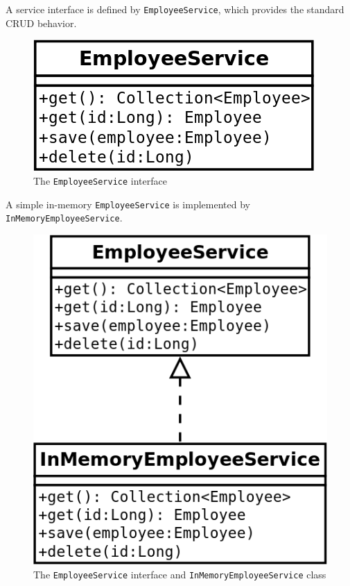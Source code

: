 \documentclass{article}
\begin{document}


A service interface is defined by \texttt{EmployeeService}, which provides the standard CRUD behavior.

\vspace{10pt}
\begin{figure}[H]
\begin{center}
\includegraphics[scale=0.5]{images/core/class-EmployeeService.png}
\end{center}
\caption{The \texttt{EmployeeService} interface}
\label{fig:core/EmployeeService}
\end{figure}



A simple in-memory \texttt{EmployeeService} is implemented by \texttt{InMemoryEmployeeService}.

\vspace{10pt}
\begin{figure}[H]
\begin{center}
\includegraphics[scale=0.5]{images/core/class-EmployeeService-InMemoryEmployeeService.png}
\end{center}
\caption{The \texttt{EmployeeService} interface and \texttt{InMemoryEmployeeService} class}
\label{fig:core/EmployeeService-InMemoryEmployeeService}
\end{figure}
\end{document}
